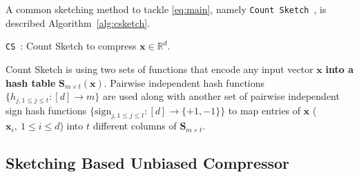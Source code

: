 \documentclass[twoside]{article}
\begin{document}
A common sketching method to tackle \eqref{eq:main}, namely \texttt{Count Sketch}~\cite{DBLP:journals/tcs/CharikarCF04}, is described Algorithm~\ref{alg:csketch}.
\begin{algorithm}[H]
\caption{\texttt{CS}~\cite{kleinberg2003bursty}: Count Sketch to compress ${\boldsymbol{x}}\in\mathbb{R}^{d}$. }\label{alg:csketch}
\begin{algorithmic}[1]
\end{algorithmic}
\end{algorithm}
Count Sketch is using two sets of functions that encode any input vector $\boldsymbol{x}$ \textbf{into a hash table} $\boldsymbol{S}_{m\times t}(\boldsymbol{x})$. 
Pairwise independent hash functions $\{h_{j,1\leq j\leq t }:[d]\rightarrow m\}$ are used along with another set of pairwise independent sign hash functions $\{\text{sign}_{j,1\leq j\leq t}: [d]\rightarrow \{+1,-1\}\}$ to map entries of $\boldsymbol{x}$ ($\boldsymbol{x}_i, \:1\leq i\leq d$) into $t$ different columns of $\mathbf{S}_{m\times t}$. 

\vspace{-0.05in}
\subsection{Sketching Based Unbiased Compressor}
\vspace{-0.05in}
\end{document}

